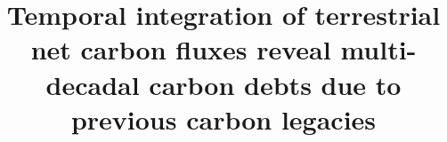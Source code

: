 \documentclass[ProofPDF]{./Styles/Jnls-Template-V3}
\begin{document}
\def\MSFirstPage{\pageref{startPage_Label}}
\def\MSLastPage{\pageref{endPage_Label}}
\graphicspath{{./Images/}}
\label{startPage_Label}
\title{Temporal integration of terrestrial net carbon fluxes reveal multi-decadal carbon debts due to previous carbon legacies}


%
%
%
\end{document}
